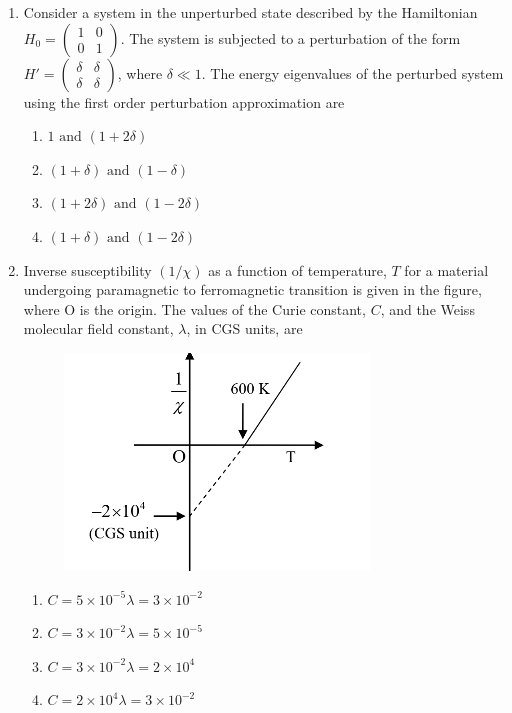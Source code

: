 \documentclass[journal,12pt,onecolumn]{IEEEtran}
\theoremstyle{remark}
\begin{document}
\begin{enumerate}
\item Consider a system in the unperturbed state described by the Hamiltonian
$H_{0}=\begin{pmatrix}1&0\\[2pt]0&1\end{pmatrix}$. The system is subjected to a
perturbation of the form
$H'=\begin{pmatrix}\delta&\delta\\[2pt]\delta&\delta\end{pmatrix}$, where
$\delta\ll 1$. The energy eigenvalues of the perturbed system using the first
order perturbation approximation are
\begin{multicols}{2}
\begin{enumerate}
\item $1 \text{ and } (1+2\delta)$
\item $(1+\delta) \text{ and } (1-\delta)$
\item $(1+2\delta) \text{ and } (1-2\delta)$
\item $(1+\delta) \text{ and } (1-2\delta)$
\end{enumerate}
\end{multicols}
\item Inverse susceptibility $(1/\chi)$ as a function of temperature, $T$ for a material undergoing paramagnetic to ferromagnetic transition is given in the figure, where O is the origin. The values of the Curie constant, $C$, and the Weiss molecular field constant, $\lambda$, in CGS units, are
\begin{figure}[H]
    \centering
    \includegraphics[width = 0.5\columnwidth]{fig/Q27.png}
    \caption*{}
    \label{fig:Q27}
    \end{figure}
\begin{multicols}{2}
\begin{enumerate}
\item $C=5\times 10^{-5} \lambda=3\times 10^{-2}$
\item $C=3\times 10^{-2} \lambda=5\times 10^{-5}$
\item $C=3\times 10^{-2} \lambda=2\times 10^{4}$
\item $C=2\times 10^{4} \lambda=3\times 10^{-2}$
\end{enumerate}
\end{multicols}


\end{enumerate}
\end{document}
